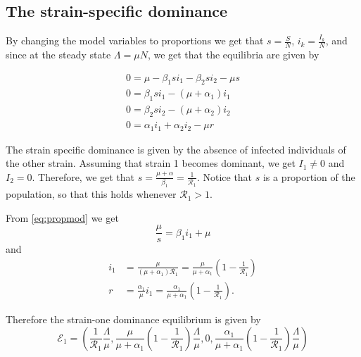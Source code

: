 \documentclass{book}\usepackage[]{graphicx}\usepackage[]{color}
\begin{document}
\subsection*{The strain-specific dominance}
By changing the model variables to proportions we get that $s=\frac{S}{N}$, $i_{k}=\frac{I_{k}}{N}$, and since at the steady state $\Lambda=\mu N$, we get that the equilibria are given by

\begin{equation} \label{eq:propmod}
\begin{array}{l}
0=\mu-\beta_{1} s i_{1}-\beta_{2} s i_{2}-\mu s \\
0=\beta_{1} s i_{1}-\left(\mu+\alpha_{1}\right) i_{1} \\
0=\beta_{2} s i_{2}-\left(\mu+\alpha_{2}\right) i_{2} \\
0=\alpha_{1} i_{1}+\alpha_{2} i_{2}-\mu r
\end{array}
\end{equation}

The strain specific dominance is given by the absence of infected individuals of the other strain. Assuming that strain 1 becomes dominant, we get $I_1\neq 0$ and $I_2=0$. Therefore, we get that $s=\frac{\mu+\alpha}{\beta_1}=\frac{1}{\mathcal{R}_1}$. Notice that $s$ is a proportion of the population, so that this holds whenever $\mathcal{R}_1>1$.

From \eqref{eq:propmod} we get 
\begin{equation}
\frac{\mu}{s}=\beta_{1} i_{1}+\mu
\end{equation}
and
\begin{equation}
\begin{aligned}
i_{1} &=\frac{\mu}{\left(\mu+\alpha_{1}\right) \mathscr{R}_{1}}=\frac{\mu}{\mu+\alpha_{1}}\left(1-\frac{1}{\mathscr{R}_{1}}\right) \\
r &=\frac{\alpha_{1}}{\mu} i_{1}=\frac{\alpha_{1}}{\mu+\alpha_{1}}\left(1-\frac{1}{\mathscr{R}_{1}}\right).
\end{aligned}
\end{equation}

Therefore the strain-one dominance equilibrium is given by
\begin{equation}
\mathscr{E}_{1}=\left(\frac{1}{\mathscr{R}_{1}} \frac{\Lambda}{\mu}, \frac{\mu}{\mu+\alpha_{1}}\left(1-\frac{1}{\mathscr{R}_{1}}\right) \frac{\Lambda}{\mu}, 0, \frac{\alpha_{1}}{\mu+\alpha_{1}}\left(1-\frac{1}{\mathscr{R}_{1}}\right) \frac{\Lambda}{\mu}\right)
\end{equation}
\end{document}
